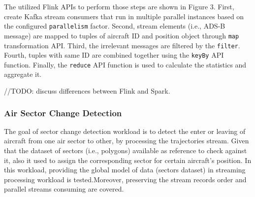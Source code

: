 \documentclass[]{article}
\begin{document}
\begin{itemize}
\par The utilized Flink APIs to perform those steps are shown in Figure 3. First, create Kafka stream consumers that run in multiple parallel instances based on the configured \texttt{parallelism} factor. Second,  stream elements (i.e., ADS-B message) are mapped  to tuples of aircraft ID and  position object through \texttt{map} transformation API. Third, the irrelevant messages are filtered by the \texttt{filter}. Fourth, tuples with same ID are combined together using the \texttt{keyBy} API function. Finally, the \texttt{reduce} API function is used to calculate the statistics and aggregate it.




//TODO: discuss differences between Flink and Spark.

\end{itemize}

\subsubsection{Air Sector Change Detection}

The goal of sector change detection workload is to detect the  enter or leaving of aircraft from one air sector to other, by processing the trajectories stream. Given that the dataset of sectors (i.e., polygons) available as reference to check against it, also it used to assign the corresponding sector for certain aircraft's position. In this workload, providing the  global model of data (sectors dataset) in streaming processing workload is tested.Moreover, preserving the stream records order and parallel streams consuming are covered.
 
\end{document}

